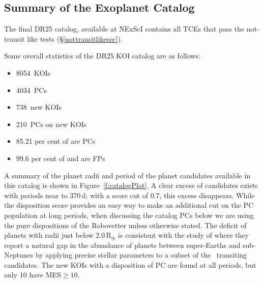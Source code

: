 \def \nkois {8054}
\def \ncand {4034}
\def \newkois {738}
\def \newcand {210}
\def \completeness {85.21}
\def \reliability {97.14}
\def \effectiveness {99.6}

\subsection{Summary of the Exoplanet Catalog}

The final DR25 catalog, available at NExScI contains all TCEs that pass the not-transit like tests (\S\ref{nottransitlikesec}). 


Some overall statistics of the DR25 KOI catalog are as follows:
\begin{itemize}
    \item \nkois{}~KOIs
    \item \ncand{}~PCs
    \item \newkois{}~new KOIs
    \item \newcand{}~PCs on new KOIs
    \item \completeness{} per cent of  are PCs
    \item \effectiveness{} per cent of  and  are FPs
\end{itemize}

A summary of the planet radii and period of the planet candidates available in this catalog is shown in Figure~\ref{f:catalogPlot}. A clear excess of candidates exists with periods near to 370\,d;  with a score cut of $0.7$, this excess disappears. While the disposition score provides an easy way to make an additional cut on the PC population at long periods, when discussing the catalog PCs below we are using the pure dispositions of the Robovetter unless otherwise stated. The deficit of planets with radii just below 2.0\,R$_{\oplus}$ is consistent with the study of \citet{Fulton2017} where they report a natural gap in the abundance of planets between super-Earths and sub-Neptunes by applying precise stellar parameters to a subset of the \kepler\ transiting candidates. The new KOIs with a disposition of PC are found at all periods, but only 10 have MES$\geq 10 $. 

